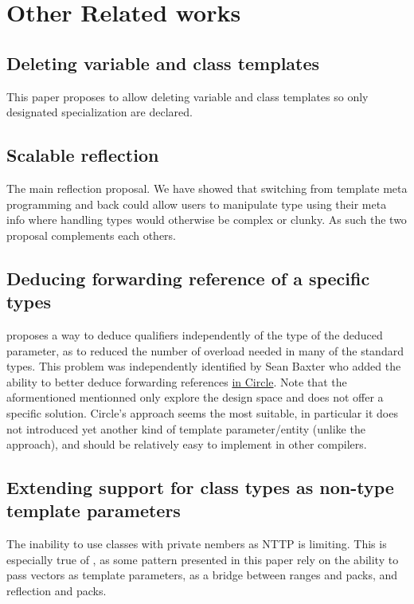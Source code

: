 \documentclass{wg21}
\begin{document}
\section{Other Related works}

\subsection{ Deleting variable and class templates}

This paper proposes to allow deleting variable and class templates so only designated specialization are declared.

\subsection{ Scalable reflection}

The main reflection proposal. We have showed that switching from template meta programming and back could allow users to manipulate type using their meta info where handling types would otherwise be complex or clunky. As such the two proposal complements each others.

\subsection{ Deducing forwarding reference of a specific types}

 proposes a way to deduce qualifiers independently of the type of the deduced parameter, as to reduced the number of overload needed in many of the standard types.
This problem was independently identified by Sean Baxter who added the ability to better deduce forwarding references \href{https://github.com/seanbaxter/circle/tree/master/tuple#deduced-forward-references}{in Circle}.
Note that the aformentioned mentionned only explore the design space and does not offer a specific solution.
Circle's approach seems the most suitable, in particular it does not introduced yet another kind of template parameter/entity (unlike the  approach),
and should be relatively easy to implement in other compilers.

\subsection{ Extending support for class types as non-type template parameters}

The inability to use classes with private nembers as NTTP is limiting.
This is especially true of , as some pattern presented in this paper rely on the ability to pass vectors as template parameters,
as a bridge between ranges and packs, and reflection and packs.
\end{document}
